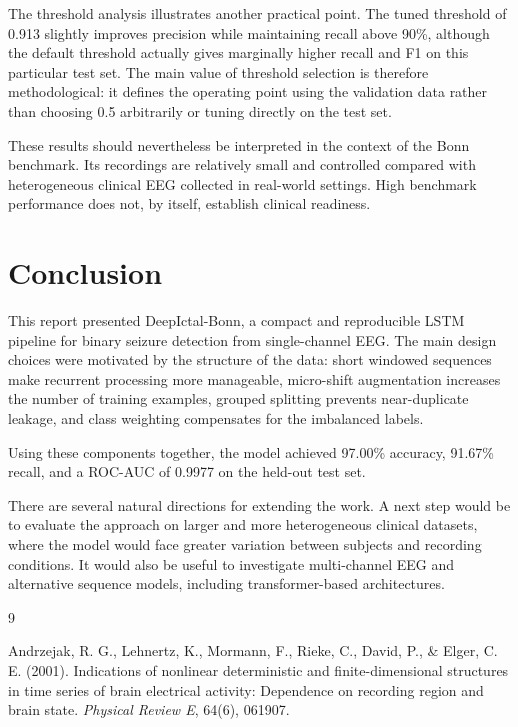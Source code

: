 \documentclass[11pt,a4paper]{article}
\begin{document}
The threshold analysis illustrates another practical point. The tuned threshold of 0.913 slightly improves precision while maintaining recall above 90\%, although the default threshold actually gives marginally higher recall and F1 on this particular test set. The main value of threshold selection is therefore methodological: it defines the operating point using the validation data rather than choosing 0.5 arbitrarily or tuning directly on the test set.

These results should nevertheless be interpreted in the context of the Bonn benchmark. Its recordings are relatively small and controlled compared with heterogeneous clinical EEG collected in real-world settings. High benchmark performance does not, by itself, establish clinical readiness.

\section{Conclusion}

This report presented DeepIctal-Bonn, a compact and reproducible LSTM pipeline for binary seizure detection from single-channel EEG. The main design choices were motivated by the structure of the data: short windowed sequences make recurrent processing more manageable, micro-shift augmentation increases the number of training examples, grouped splitting prevents near-duplicate leakage, and class weighting compensates for the imbalanced labels.

Using these components together, the model achieved 97.00\% accuracy, 91.67\% recall, and a ROC-AUC of 0.9977 on the held-out test set.

There are several natural directions for extending the work. A next step would be to evaluate the approach on larger and more heterogeneous clinical datasets, where the model would face greater variation between subjects and recording conditions. It would also be useful to investigate multi-channel EEG and alternative sequence models, including transformer-based architectures.

\begin{thebibliography}{9}

Andrzejak, R. G., Lehnertz, K., Mormann, F., Rieke, C., David, P., \& Elger, C. E. (2001).
Indications of nonlinear deterministic and finite-dimensional structures in time series of
brain electrical activity: Dependence on recording region and brain state.
\textit{Physical Review E}, 64(6), 061907.

\end{thebibliography}
\end{document}
